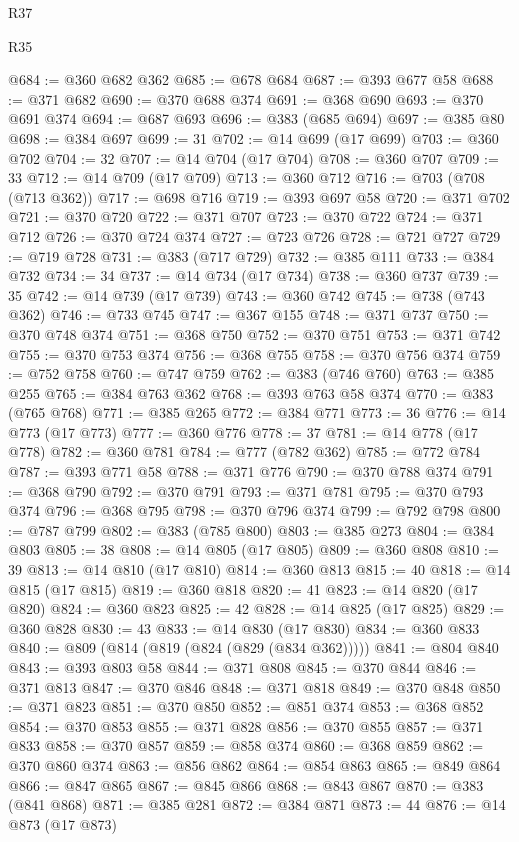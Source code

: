 \begin{lexlean}{R37}
\begin{lexlean}{R35}
\begin{coremodule}
{{{{{{{{{{{{{{{{{{{{{{{{{{{{{{{{{{{{{{{{{{{{{{{{{{{{@684 := @360 @682 @362
@685 := @678 @684
@687 := @393 @677 @58
@688 := @371 @682
@690 := @370 @688 @374
@691 := @368 @690
@693 := @370 @691 @374
@694 := @687 @693
@696 := @383 (@685 @694)
@697 := @385 @80
@698 := @384 @697
@699 := 31
@702 := @14 @699 (@17 @699)
@703 := @360 @702
@704 := 32
@707 := @14 @704 (@17 @704)
@708 := @360 @707
@709 := 33
@712 := @14 @709 (@17 @709)
@713 := @360 @712
@716 := @703 (@708 (@713 @362))
@717 := @698 @716
@719 := @393 @697 @58
@720 := @371 @702
@721 := @370 @720
@722 := @371 @707
@723 := @370 @722
@724 := @371 @712
@726 := @370 @724 @374
@727 := @723 @726
@728 := @721 @727
@729 := @719 @728
@731 := @383 (@717 @729)
@732 := @385 @111
@733 := @384 @732
@734 := 34
@737 := @14 @734 (@17 @734)
@738 := @360 @737
@739 := 35
@742 := @14 @739 (@17 @739)
@743 := @360 @742
@745 := @738 (@743 @362)
@746 := @733 @745
@747 := @367 @155
@748 := @371 @737
@750 := @370 @748 @374
@751 := @368 @750
@752 := @370 @751
@753 := @371 @742
@755 := @370 @753 @374
@756 := @368 @755
@758 := @370 @756 @374
@759 := @752 @758
@760 := @747 @759
@762 := @383 (@746 @760)
@763 := @385 @255
@765 := @384 @763 @362
@768 := @393 @763 @58 @374
@770 := @383 (@765 @768)
@771 := @385 @265
@772 := @384 @771
@773 := 36
@776 := @14 @773 (@17 @773)
@777 := @360 @776
@778 := 37
@781 := @14 @778 (@17 @778)
@782 := @360 @781
@784 := @777 (@782 @362)
@785 := @772 @784
@787 := @393 @771 @58
@788 := @371 @776
@790 := @370 @788 @374
@791 := @368 @790
@792 := @370 @791
@793 := @371 @781
@795 := @370 @793 @374
@796 := @368 @795
@798 := @370 @796 @374
@799 := @792 @798
@800 := @787 @799
@802 := @383 (@785 @800)
@803 := @385 @273
@804 := @384 @803
@805 := 38
@808 := @14 @805 (@17 @805)
@809 := @360 @808
@810 := 39
@813 := @14 @810 (@17 @810)
@814 := @360 @813
@815 := 40
@818 := @14 @815 (@17 @815)
@819 := @360 @818
@820 := 41
@823 := @14 @820 (@17 @820)
@824 := @360 @823
@825 := 42
@828 := @14 @825 (@17 @825)
@829 := @360 @828
@830 := 43
@833 := @14 @830 (@17 @830)
@834 := @360 @833
@840 := @809 (@814 (@819 (@824 (@829 (@834 @362)))))
@841 := @804 @840
@843 := @393 @803 @58
@844 := @371 @808
@845 := @370 @844
@846 := @371 @813
@847 := @370 @846
@848 := @371 @818
@849 := @370 @848
@850 := @371 @823
@851 := @370 @850
@852 := @851 @374
@853 := @368 @852
@854 := @370 @853
@855 := @371 @828
@856 := @370 @855
@857 := @371 @833
@858 := @370 @857
@859 := @858 @374
@860 := @368 @859
@862 := @370 @860 @374
@863 := @856 @862
@864 := @854 @863
@865 := @849 @864
@866 := @847 @865
@867 := @845 @866
@868 := @843 @867
@870 := @383 (@841 @868)
@871 := @385 @281
@872 := @384 @871
@873 := 44
@876 := @14 @873 (@17 @873)
}}}}}}}}}}}}}}}}}}}}}}}}}}}}}}}}}}}}}}}}}}}}}}}}}}}}
\end{coremodule}
\end{lexlean}
\end{lexlean}
